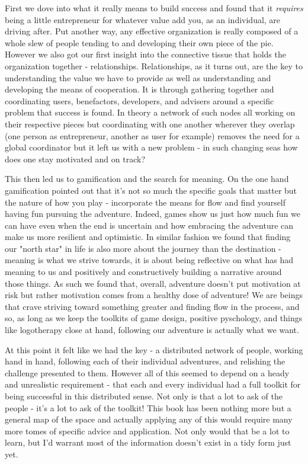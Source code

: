 \documentclass[11pt,a5paper]{book}
\begin{document}
First we dove into what it really means to build success and found that it \textit{requires} being a little entrepreneur for whatever value add you, as an individual, are driving after. Put another way, any effective organization is really composed of a whole slew of people tending to and developing their own piece of the pie. However we also got our first insight into the connective tissue that holds the organization together - relationships. Relationships, as it turns out, are the key to understanding the value we have to provide as well as understanding and developing the means of cooperation. It is through gathering together and coordinating users, benefactors, developers, and advisers around a specific problem that success is found. In theory a network of such nodes all working on their respective pieces but coordinating with one another wherever they overlap (one person as entrepreneur, another as user for example) removes the need for a global coordinator but it left us with a new problem - in such changing seas how does one stay motivated and on track?
\newline

This then led us to gamification and the search for meaning. On the one hand gamification pointed out that it's not so much the specific goals that matter but the nature of how you play - incorporate the means for flow and find yourself having fun pursuing the adventure. Indeed, games show us just how much fun we can have even when the end is uncertain and how embracing the adventure can make us more resilient and optimistic. In similar fashion we found that finding our "north star" in life is also more about the journey than the destination - meaning is what we strive towards, it is about being reflective on what has had meaning to us and positively and constructively building a narrative around those things. As such we found that, overall, adventure doesn't put motivation at risk but rather motivation comes from a healthy dose of adventure! We are beings that crave striving toward something greater and finding flow in the process, and so, as long as we keep the toolkits of game design, positive pyschology, and things like logotherapy close at hand, following our adventure is actually what we want.
\newline

At this point it felt like we had the key - a distributed network of people, working hand in hand, following each of their individual adventures, and relishing the challenge presented to them. However all of this seemed to depend on a heady and unrealistic requirement - that each and every individual had a full toolkit for being successful in this distributed sense. Not only is that a lot to ask of the people - it's a lot to ask of the toolkit! This book has been nothing more but a general map of the space and actually applying any of this would require many more tomes of specific advice and application. Not only would that be a lot to learn, but I'd warrant most of the information doesn't exist in a tidy form just yet. 
\newline
\end{document}
